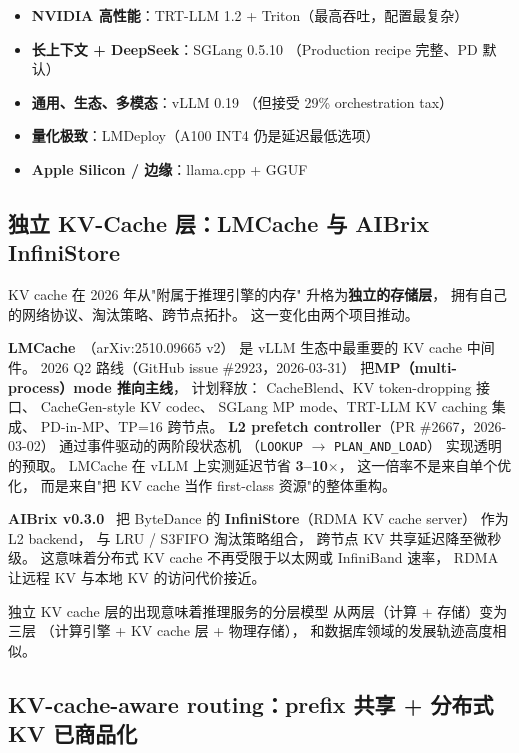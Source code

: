 \begin{keybox}[2026 Q2 推理引擎选型矩阵]
\begin{itemize}[noitemsep]
  \item \textbf{NVIDIA 高性能}：TRT-LLM 1.2 + Triton（最高吞吐，配置最复杂）
  \item \textbf{长上下文 + DeepSeek}：SGLang 0.5.10
        （Production recipe 完整、PD 默认）
  \item \textbf{通用、生态、多模态}：vLLM 0.19
        （但接受 29\% orchestration tax）
  \item \textbf{量化极致}：LMDeploy（A100 INT4 仍是延迟最低选项）
  \item \textbf{Apple Silicon / 边缘}：llama.cpp + GGUF
\end{itemize}
\end{keybox}

\subsection{独立 KV-Cache 层：LMCache 与 AIBrix InfiniStore}
\label{sec:kv-cache-layer}

KV cache 在 2026 年从"附属于推理引擎的内存"
升格为\textbf{独立的存储层}，
拥有自己的网络协议、淘汰策略、跨节点拓扑。
这一变化由两个项目推动。

\textbf{LMCache}~\cite{lmcache2026}（arXiv:2510.09665 v2）
是 vLLM 生态中最重要的 KV cache 中间件。
2026 Q2 路线（GitHub issue \#2923，2026-03-31）
把\textbf{MP（multi-process）mode 推向主线}，
计划释放：
CacheBlend、KV token-dropping 接口、
CacheGen-style KV codec、
SGLang MP mode、TRT-LLM KV caching 集成、
PD-in-MP、TP=16 跨节点。
\textbf{L2 prefetch controller}（PR \#2667，2026-03-02）
通过事件驱动的两阶段状态机
（\texttt{LOOKUP} $\to$ \texttt{PLAN\_AND\_LOAD}）
实现透明的预取。
LMCache 在 vLLM 上实测延迟节省 \textbf{3--10$\times$}，
这一倍率不是来自单个优化，
而是来自"把 KV cache 当作 first-class 资源"的整体重构。

\textbf{AIBrix v0.3.0}~\cite{aibrix030}
把 ByteDance 的 \textbf{InfiniStore}（RDMA KV cache server）
作为 L2 backend，
与 LRU / S3FIFO 淘汰策略组合，
跨节点 KV 共享延迟降至微秒级。
这意味着分布式 KV cache 不再受限于以太网或 InfiniBand 速率，
RDMA 让远程 KV 与本地 KV 的访问代价接近。

独立 KV cache 层的出现意味着推理服务的分层模型
从两层（计算 + 存储）变为三层
（计算引擎 + KV cache 层 + 物理存储），
和数据库领域的发展轨迹高度相似。

\subsection{KV-cache-aware routing：prefix 共享 + 分布式 KV 已商品化}
\label{sec:kv-aware-routing}

